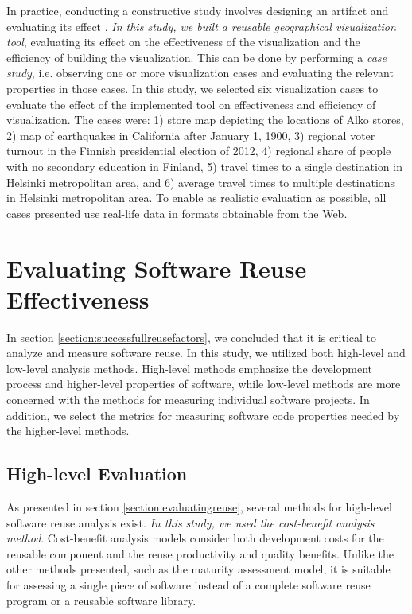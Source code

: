 In practice, conducting a constructive study involves designing an artifact and evaluating its effect \citep{jarvinen_tutkimustyon_2012}. \emph{In this study, we built a reusable geographical visualization tool}, evaluating its effect on the effectiveness of the visualization and the efficiency of building the visualization. This can be done by performing a \emph{case study}, i.e. observing one or more visualization cases and evaluating the relevant properties in those cases. In this study, we selected six visualization cases to evaluate the effect of the implemented tool on effectiveness and efficiency of visualization. The cases were: 1) store map depicting the locations of Alko stores, 2) map of earthquakes in California after January 1, 1900, 3) regional voter turnout in the Finnish presidential election of 2012, 4) regional share of people with no secondary education in Finland, 5) travel times to a single destination in Helsinki metropolitan area, and 6) average travel times to multiple destinations in Helsinki metropolitan area. To enable as realistic evaluation as possible, all cases presented use real-life data in formats obtainable from the Web.

\section{Evaluating Software Reuse Effectiveness}

In section \ref{section:successfullreusefactors}, we concluded that it is critical to analyze and measure software reuse. In this study, we utilized both high-level and low-level analysis methods. High-level methods emphasize the development process and higher-level properties of software, while low-level methods are more concerned with the methods for measuring individual software projects. In addition, we select the metrics for measuring software code properties needed by the higher-level methods.

\subsection{High-level Evaluation}
As presented in section \ref{section:evaluatingreuse}, several methods for high-level software reuse analysis exist. \emph{In this study, we used the cost-benefit analysis method}. Cost-benefit analysis models consider both development costs for the reusable component and the reuse productivity and quality benefits. Unlike the other methods presented, such as the maturity assessment model, it is suitable for assessing a single piece of software instead of a complete software reuse program or a reusable software library.

